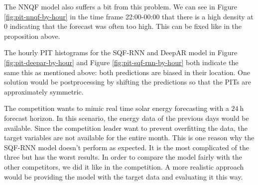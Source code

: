 The NNQF model also suffers a bit from this problem. We can see 
in Figure \ref{fig:pit-nnqf-by-hour} in the time frame 22:00-00:00 that 
there is a high density at \(0\) indicating that the forecast 
was often too high. This can be fixed like in the proposition above.

The hourly PIT histograms for the SQF-RNN and DeepAR model in 
Figure \ref{fig:pit-deepar-by-hour} and Figure \ref{fig:pit-sqf-rnn-by-hour} 
both indicate the same this as mentioned above: both predictions are biased 
in their location. One solution would be postprocessing by shifting the 
predictions so that the PITs are approximately symmetric. 

The competition wants to mimic real time solar energy forecasting with 
a \(\SI{24}{\hour}\) forecast horizon. In this scenario, the energy data of 
the previous days would be available. Since the competition leader want to 
prevent overfitting the data, the target variables are not available for 
the entire month. This is one reason why the SQF-RNN model doesn't perform 
as expected. 
It is the most complicated of the three but has the worst results. 
In order to compare the model fairly with the other competitors, 
we did it like in the competition. A more realistic approach would be 
providing the model with the target data and evaluating it this way.